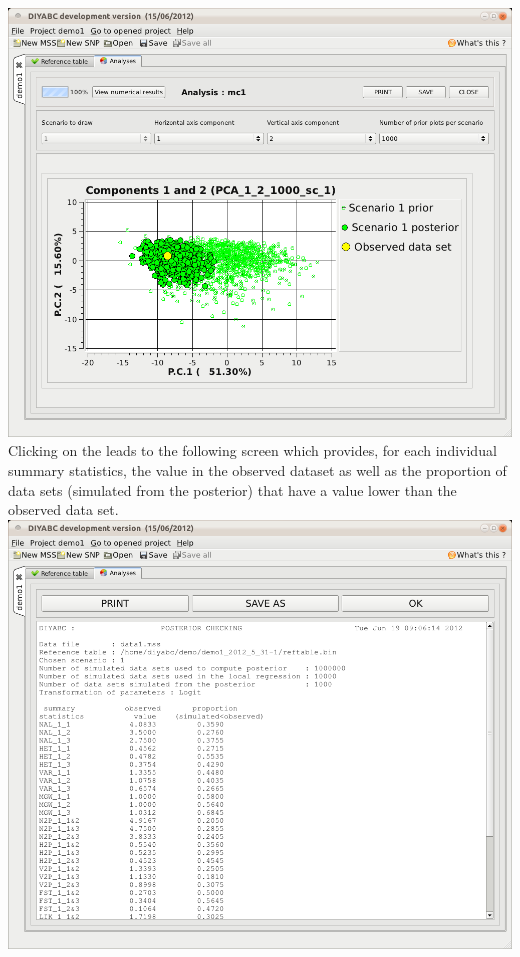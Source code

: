 \includegraphics[scale=0.33]{gui_pictures/Capture-DIYABC-58.png} \\

Clicking on the  leads to the following screen which provides, for each individual summary statistics, the value in the observed dataset as well as the proportion of data sets (simulated from the posterior) that have a value lower than the observed data set.\\
 
\includegraphics[scale=0.33]{gui_pictures/Capture-DIYABC-60.png} \\

